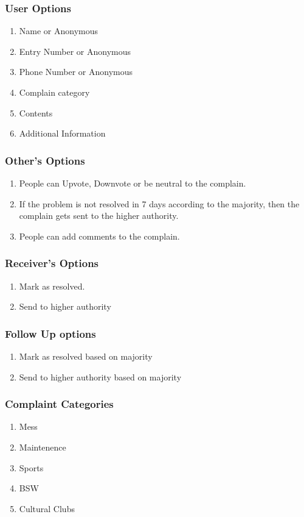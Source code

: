 \documentclass{article}
\begin{document}
			\subsubsection{User Options}
				\begin{enumerate}
					\item Name or Anonymous
					\item Entry Number or Anonymous 
					\item Phone Number or Anonymous
					\item Complain category
					\item Contents
					\item Additional Information
				\end{enumerate}
			\subsubsection{Other's Options}
				\begin{enumerate}
					\item People can Upvote, Downvote or be neutral to the complain.
					\item If the problem is not resolved in 7 days according to the majority, then the complain gets sent to the higher authority.
					\item People can add comments to the complain.
				\end{enumerate}
			\subsubsection{Receiver's Options}
				\begin{enumerate}
					\item Mark as resolved.
					\item Send to higher authority
				\end{enumerate}
			\subsubsection{Follow Up options}
				\begin{enumerate}
					\item Mark as resolved based on majority
					\item Send to higher authority based on majority
				\end{enumerate}
			\subsubsection{Complaint Categories}
				\begin{enumerate}
					\item Mess
					\item Maintenence
					\item Sports
					\item BSW
					\item Cultural Clubs
				\end{enumerate}
\end{document}
